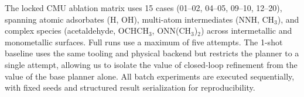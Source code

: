 The locked CMU ablation matrix uses 15 cases (01--02, 04--05, 09--10, 12--20), spanning atomic adsorbates (H, OH), multi-atom intermediates (NNH, CH$_3$), and complex species (acetaldehyde, OCHCH$_3$, ONN(CH$_3$)$_2$) across intermetallic and monometallic surfaces. Full runs use a maximum of five attempts. The 1-shot baseline uses the same tooling and physical backend but restricts the planner to a single attempt, allowing us to isolate the value of closed-loop refinement from the value of the base planner alone. All batch experiments are executed sequentially, with fixed seeds and structured result serialization for reproducibility.
